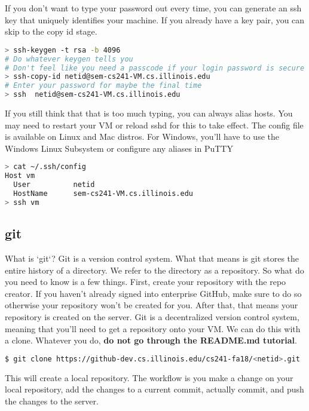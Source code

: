 If you don't want to type your password out every time, you can generate an ssh key that uniquely identifies your machine. If you already have a key pair, you can skip to the copy id stage.

\begin{lstlisting}[language=bash]
> ssh-keygen -t rsa -b 4096
# Do whatever keygen tells you
# Don't feel like you need a passcode if your login password is secure
> ssh-copy-id netid@sem-cs241-VM.cs.illinois.edu
# Enter your password for maybe the final time
> ssh  netid@sem-cs241-VM.cs.illinois.edu
\end{lstlisting}

If you still think that that is too much typing, you can always alias hosts.
You may need to restart your VM or reload sshd for this to take effect.
The config file is available on Linux and Mac distros.
For Windows, you'll have to use the Windows Linux Subsystem or configure any aliases in PuTTY

\begin{lstlisting}[language=bash]
> cat ~/.ssh/config
Host vm
  User          netid
  HostName      sem-cs241-VM.cs.illinois.edu
> ssh vm
\end{lstlisting}

\subsection{git}

What is `git`? Git is a version control system. What that means is git stores the entire history of a directory. We refer to the directory as a repository. So what do you need to know is a few things. First, create your repository with the repo creator. If you haven't already signed into enterprise GitHub, make sure to do so otherwise your repository won't be created for you. After that, that means your repository is created on the server. Git is a decentralized version control system, meaning that you'll need to get a repository onto your VM. We can do this with a clone. Whatever you do, \textbf{do not go through the README.md tutorial}.

\begin{lstlisting}[language=bash]
$ git clone https://github-dev.cs.illinois.edu/cs241-fa18/<netid>.git
\end{lstlisting}

This will create a local repository. The workflow is you make a change on your local repository, add the changes to a current commit, actually commit, and push the changes to the server.


